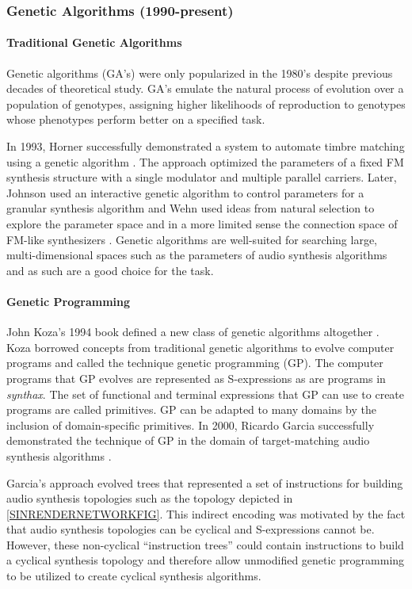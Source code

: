 \documentclass[12pt]{article}
\newcommand{\audiolanguagenamelower}{\emph{synthax}}
\begin{document}
\subsubsection{Genetic Algorithms (1990-present)}
\paragraph{Traditional Genetic Algorithms}
Genetic algorithms (GA's) were only popularized in the 1980's despite previous decades of theoretical study. GA's emulate the natural process of evolution over a population of genotypes, assigning higher likelihoods of reproduction to genotypes whose phenotypes perform better on a specified task.

In 1993, Horner successfully demonstrated a system to automate timbre matching using a genetic algorithm \citep{horner1993machine}. The approach optimized the parameters of a fixed FM synthesis structure with a single modulator and multiple parallel carriers. Later, Johnson used an interactive genetic algorithm to control parameters for a granular synthesis algorithm \citep{johnson1999exploring} and Wehn used ideas from natural selection to explore the parameter space and in a more limited sense the connection space of FM-like synthesizers \citep{wehn1998using}. Genetic algorithms are well-suited for searching large, multi-dimensional spaces such as the parameters of audio synthesis algorithms and as such are a good choice for the task.

\paragraph{Genetic Programming}
John Koza's 1994 book defined a new class of genetic algorithms altogether \citep{koza1992genetic}. Koza borrowed concepts from traditional genetic algorithms to evolve computer programs and called the technique genetic programming (GP). The computer programs that GP evolves are represented as S-expressions as are programs in \audiolanguagenamelower. The set of functional and terminal expressions that GP can use to create programs are called primitives. GP can be adapted to many domains by the inclusion of domain-specific primitives. In 2000, Ricardo Garcia successfully demonstrated the technique of GP in the domain of target-matching audio synthesis algorithms \citep{garcia2000towards}.

Garcia's approach evolved trees that represented a set of instructions for building audio synthesis topologies such as the topology depicted in \ref{SINRENDERNETWORKFIG}. This indirect encoding was motivated by the fact that audio synthesis topologies can be cyclical and S-expressions cannot be. However, these non-cyclical ``instruction trees'' could contain instructions to build a cyclical synthesis topology and therefore allow unmodified genetic programming to be utilized to create cyclical synthesis algorithms.
\end{document}
